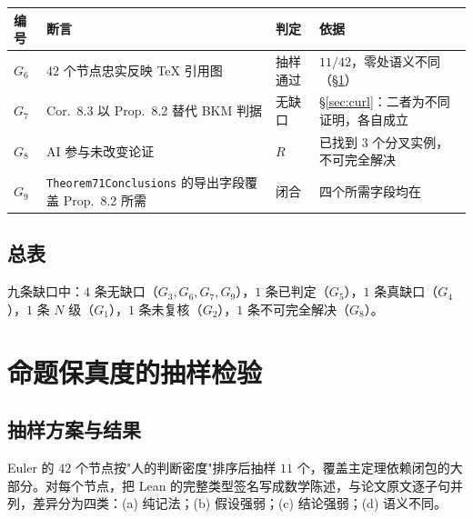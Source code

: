 \documentclass[11pt,a4paper]{ctexart}
\theoremstyle{definition}
\begin{document}
\begin{center}
\begin{tabular}{@{}p{1.3cm}p{7.2cm}p{1.5cm}p{4.4cm}@{}}
\toprule
编号 & 断言 & 判定 & 依据 \\
\midrule
$G_6$ & $42$ 个节点忠实反映 TeX 引用图 & 抽样通过 & $11/42$，零处语义不同（\S\ref{sec:fidelity}） \\
$G_7$ & Cor.~8.3 以 Prop.~8.2 替代 BKM 判据 & 无缺口 & \S\ref{sec:curl}：二者为不同证明，各自成立 \\
$G_8$ & AI 参与未改变论证 & $R$ & 已找到 $3$ 个分叉实例，不可完全解决 \\
$G_9$ & \texttt{Theorem71Conclusions} 的导出字段覆盖 Prop.~8.2 所需 & 闭合 & 四个所需字段均在 \\
\bottomrule
\end{tabular}
\end{center}

\subsection{总表}

九条缺口中：$4$ 条无缺口（$G_3,G_6,G_7,G_9$），$1$ 条已判定（$G_5$），$1$ 条真缺口（$G_4$），$1$ 条 $N$ 级（$G_1$），$1$ 条未复核（$G_2$），$1$ 条不可完全解决（$G_8$）。

\section{命题保真度的抽样检验}\label{sec:fidelity}

\subsection{抽样方案与结果}

Euler 的 $42$ 个节点按"人的判断密度"排序后抽样 $11$ 个，覆盖主定理依赖闭包的大部分。对每个节点，把 Lean 的完整类型签名写成数学陈述，与论文原文逐子句并列，差异分为四类：(a) 纯记法；(b) 假设强弱；(c) 结论强弱；(d) 语义不同。
\end{document}
